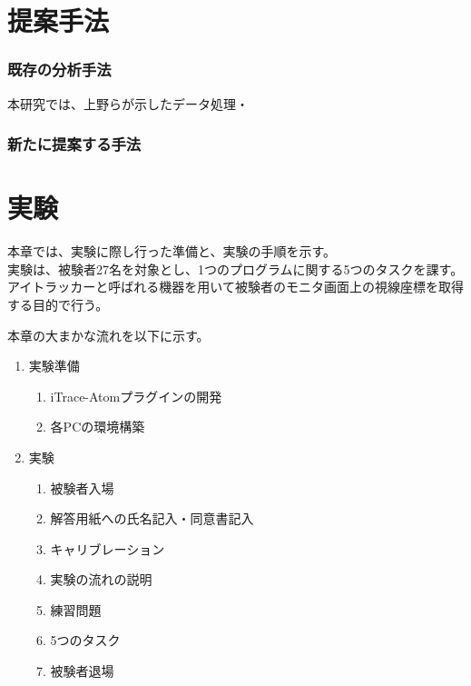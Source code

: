 \documentclass[paper=a4paper,fontsize=10pt]{jlreq}
\begin{document}
\part{提案手法}
  \section{既存の分析手法}
  本研究では、上野らが示したデータ処理・

  \section{新たに提案する手法}
  

\part{実験}
  本章では、実験に際し行った準備と、実験の手順を示す。\\
  実験は、被験者27名を対象とし、1つのプログラムに関する5つのタスクを課す。
  アイトラッカーと呼ばれる機器を用いて被験者のモニタ画面上の視線座標を取得する目的で行う。
  
  本章の大まかな流れを以下に示す。
  \begin{enumerate}
    \item 実験準備
      \begin{enumerate}
        \item iTrace-Atomプラグインの開発
        \item 各PCの環境構築
      \end{enumerate}
    \item 実験
      \begin{enumerate}
        \item 被験者入場
        \item 解答用紙への氏名記入・同意書記入
        \item キャリブレーション
        \item 実験の流れの説明
        \item 練習問題
        \item 5つのタスク
        \item 被験者退場
      \end{enumerate}
  \end{enumerate}
\end{document}

